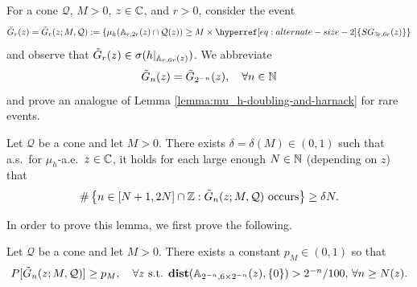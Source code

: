 \documentclass[12pt]{amsart}
\numberwithin{equation}{section}
\newcommand{\SGrho}[2]{\hyperref[eq:alternate-size-2]{SG_{#1}(#2)}}
\begin{document}
	For a cone $\mathcal Q$, $M > 0$,  $z \in \mathbb{C}$, and $r > 0$, consider the event
	\begin{equation} \label{eq:mu-h-wild}
	\tilde G_{r}(z) = \tilde G_{r}(z; M, \mathcal Q) := \left\{\mu_{h}(\A_{r, 2r}(z) \cap \mathcal Q(z)) \geq  M \times \SGrho{3r, 6r}{z} \right\}
	\end{equation}
	and observe that $\tilde G_{r}(z) \in \sigma(h |_{\mathbb{A}_{r, 6r}(z)})$.
	We abbreviate
	\begin{equation}
	\tilde G_n(z) = \tilde G_{2^{-n}}(z), \quad \forall n\in\mathbb{N} 
	\end{equation}
	and prove an analogue of Lemma \ref{lemma:mu_h-doubling-and-harnack} for rare events.  
	\begin{lemma} \label{lemma:mu_h-bad-and-harnack}
		Let $\mathcal Q$ be a cone and let $M > 0$. There exists $\delta = \delta(M) \in (0,1)$ such that a.s.\ for $\mu_h$-a.e.\ $z\in  \mathbb{C}$, it holds for each large enough $N\in \mathbb{N}$ (depending on $z$) that
		\begin{equation} \label{eq:mu_h-bad}
		\#\left\{ n \in [N+1,2N] \cap \mathbb{Z}  : \mbox{$\tilde G_n(z; M, \mathcal Q)$ occurs} \right\}  \geq \delta N.
		\end{equation}  
	\end{lemma}
	In order to prove this lemma, we first prove the following.
	\begin{lemma} \label{lemma:positive-probability}
		Let $\mathcal Q$ be a cone and let $M > 0$. There exists a constant $p_M \in (0,1)$ so  that
		\begin{equation} \label{eq:desired-claim}
		P[ \tilde G_n(z; M, \mathcal Q)] \geq p_M, \quad \mbox{$\forall z$ s.t. $\mathop{\bf dist{}}(\mathbb{A}_{2^{-n}, 6 \times 2^{-n}}(z), \{0\}) > 2^{-n}/100$,  $\forall n \geq N(z)$.}
		\end{equation}
	\end{lemma}
	
	
	
	
	
\end{document}
